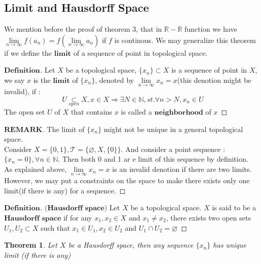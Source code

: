 \documentclass[a4paper, 11pt]{article}
\newtheorem{theorem}{Theorem}
\theoremstyle{definition}
\theoremstyle{remark}
\newenvironment{myremark}
{\renewcommand\qedsymbol{$ $}\begin{proof}[$\mathbf{REMARK}$]}
  {\end{proof}}
\newenvironment{mydef}
{\renewcommand\qedsymbol{$ $}\begin{proof}[$\mathbf{Definition}$]}
  {\end{proof}}
\theoremstyle{definition}
\begin{document}
\subsection{Limit and Hausdorff Space}
We mention before the proof of theorem 3, that in $\mathbb{R}-\mathbb{R}$ function
we have $\lim\limits_{n\to \infty}f(a_n)=f(\lim\limits_{n\to \infty}a_n)$ if 
$f$ is continous. We may generalize this theorem if we
define the $\textbf{limit}$ of a sequence of point in topological space.
\vspace{0.5cm}
\begin{mydef}
        Let $X$ be a topological space, $\{x_n\}\subset X$ is a sequence of point
        in $X$, we say $x$ is the $\textbf{limit}$ of $\{x_n\}$, denoted by
        $\lim\limits_{n\to\infty}x_n=x$(this denotion might be invalid), if :\\
        \indent
        $$
        U\underset{open}{\subset}X, x\in X\Rightarrow
        \exists N\in \mathbb{N}, st. \forall n>N, x_n\in U
        $$ The open set $U$ of $X$ that contains $x$ is called a $\textbf
        {neighborhood}$ of $x$
\end{mydef}
\begin{myremark}
        The limit of $\{x_n\}$ might not be unique in a general topological space. 
\\
\indent
        Consider $X=\{0,1\}, \mathcal{T}=\{\varnothing, X, \{0\}\}$. And consider
        a point sequence :$\{x_n=0\},\forall n\in \mathbb{N}$. Then both 0 and 1 ar         e limit of this sequence by definition.\\
        \indent
        As explained above, $\lim\limits_{n\to\infty} x_n=x$ is an invalid denotion
        if there are two limits. However, we may put a constraints on the space
        to make there exists only one limit(if there is any) for a sequence.
\end{myremark}
\vspace{0.5cm}
\begin{mydef}$\textbf{(Hausdorff space)}$
        Let $X$ be a topological space. $X$ is said to be a $\textbf{Hausdorff}$
       $\textbf{space}$ if for any $x_1,x_2\in X$ and $x_1\neq x_2$, there exists two
       open sets $U_1,U_2\subset X$ such that $x_1\in U_1, x_2\in U_2$ and 
       $U_1\cap U_2=\varnothing$
\end{mydef}
\vspace{0.3cm}
\begin{theorem}
        Let $X$ be a Hausdorff space, then any sequence $\{x_n\}$ has unique limit
        (if there is any)
\end{theorem}
\end{document}
